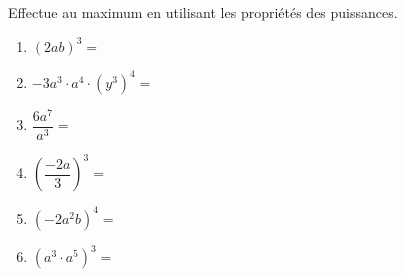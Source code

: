 %
%
    Effectue au maximum en utilisant les propriétés des puissances.
    \begin{enumerate}[cols=2, itemsep=3cm]
        \item $\left(2ab\right)^3=$ %
        \item $-3a^3\cdot a^4\cdot \left(y^3\right)^4=$ %
        \item $\dfrac{6a^7}{a^3}=$ %
        \item $\left( \dfrac{-2a}{3}\right)^3=$ %
        \item $\left(-2a^2b\right)^4=$ %
        \item $\left(a^3 \cdot a^5\right)^3= $ %
    \end{enumerate}
    \vspace*{3cm}
